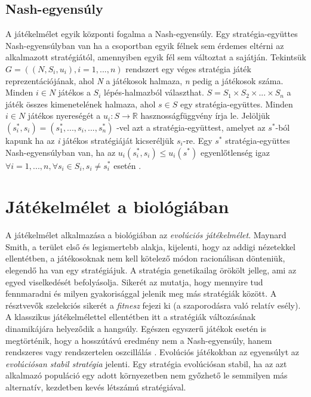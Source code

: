 \subsection{Nash-egyensúly}
A játékelmélet egyik központi fogalma a Nash-egyensúly. Egy stratégia-együttes Nash-egyensúlyban van ha a csoportban egyik félnek sem érdemes eltérni az alkalmazott stratégiától, amennyiben egyik fél sem változtat a sajátján. Tekintsük \(G = ((N,S_i,u_i), i = 1,...,n)\) rendszert egy véges stratégia játék reprezentációjának, ahol \textit{N} a játékosok halmaza, \textit{n} pedig a játékosok száma. Minden \(i \in N\) játékos a \(S_i\) lépés-halmazból választhat. \(S = S_1 \times S_2 \times ... \times S_n\)  a játék összes kimenetelének halmaza, ahol \(s \in S\) egy stratégia-együttes. Minden \(i \in N\) játékos nyereségét a \(u_i:S \to \mathbb{R}\) hasznosságfüggvény írja le. Jelöljük \((s_i^*,s_i) = (s^*_1,...,s_i,...,s_n^*)\) -vel azt a stratégia-együttest, amelyet az \(s^*\)-ból kapunk ha az \textit{i} játékos stratégiáját kicseréljük \(s_i\)-re. Egy \(s^*\) stratégia-együttes Nash-egyensúlyban van, ha az \(u_i(s_i^*,s_i)\leq u_i(s^*) \) egyenlőtlenség igaz \(\forall i = 1,...,n, \forall s_i \in S_i, s_i \ne s_i^*\) esetén \cite{nash1951non}.

\section{Játékelmélet a biológiában}
A játékelmélet alkalmazása a biológiában az \textit{evolúciós játékelmélet}. Maynard Smith, a terület első és legismertebb alakja, kijelenti, hogy az addigi nézetekkel ellentétben, a játékosoknak nem kell kötelező módon racionálisan dönteniük, elegendő ha van egy stratégiájuk. A stratégia genetikailag örökölt jelleg, ami az egyed viselkedését befolyásolja. Sikerét az mutatja, hogy mennyire tud fennmaradni és milyen gyakorisággal jelenik meg más stratégiák között. A résztvevők szelekciós sikerét a \textit{fitnesz} fejezi ki (a szaporodásra való relatív esély). A klasszikus játékelmélettel ellentétben itt a stratégiák változásának dinamikájára helyeződik a hangsúly. Egészen egyszerű játékok esetén is megtörténik, hogy a hosszútávú eredmény nem a Nash-egyensúly, hanem rendszeres vagy rendszertelen oszcillálás \cite{nowak2004evolutionary}. Evolúciós játékokban az egyensúlyt az \textit{evolúciósan stabil stratégia} jelenti. Egy stratégia evolúciósan stabil, ha az azt alkalmazó populáció egy adott környezetben nem győzhető le semmilyen más alternatív, kezdetben kevés létszámú stratégiával.
 
